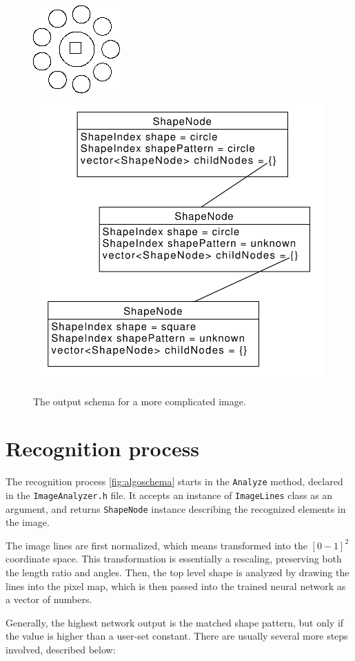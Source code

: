 \begin{description}
\begin{figure}
\centering
\includegraphics[width=.3\linewidth]{ext/images/example_output1.png}
\quad
\includegraphics[width=.3\linewidth]{ext/images/example_output1.pdf}
\caption{The output schema for a more complicated image. }
\label{output1}
\end{figure}


\end{description}

\section{Recognition process}
The recognition process \ref{fig:algoschema} starts in the \texttt{Analyze} method, declared in the \texttt{ImageAnalyzer.h} file. It accepts an instance of \texttt{ImageLines} class as an argument, and returns \texttt{ShapeNode} instance describing the recognized elements in the image.

The image lines are first normalized, which means transformed into the $[0-1]^2$ coordinate space. This transformation is essentially a rescaling, preserving both the length ratio and angles. Then, the top level shape is analyzed by drawing the lines into the pixel map, which is then passed into the trained neural network as a vector of numbers. 

Generally, the highest network output is the matched shape pattern, but only if the value is higher than a user-set constant. There are usually several more steps involved, described below:

